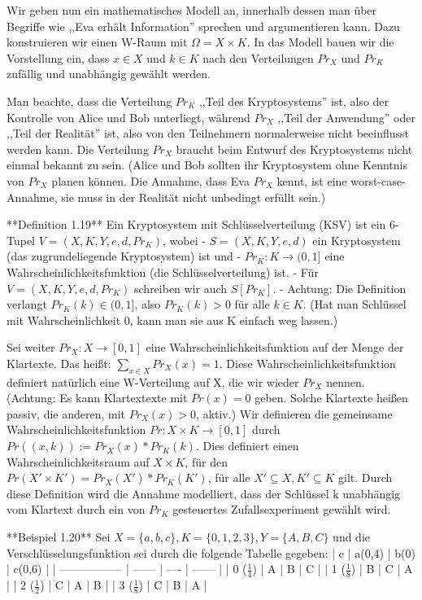 \documentclass[a4paper]{article}
\begin{document}
\begin{multicols}{3}
    Wir geben nun ein mathematisches Modell an, innerhalb dessen man über Begriffe wie ,,Eva erhält Information'' sprechen und argumentieren kann. Dazu konstruieren wir einen W-Raum mit $\Omega=X\times K$. In das Modell bauen wir die Vorstellung ein, dass $x\in X$ und $k\in K$ nach den Verteilungen $Pr_X$ und $Pr_K$ zufällig und unabhängig gewählt werden.

    Man beachte, dass die Verteilung $Pr_K$ ,,Teil des Kryptosystems'' ist, also der Kontrolle von Alice und Bob unterliegt, während $Pr_X$ ,,Teil der Anwendung'' oder ,,Teil der Realität'' ist, also von den Teilnehmern normalerweise nicht beeinflusst werden kann. Die Verteilung $Pr_X$ braucht beim Entwurf des Kryptosystems nicht einmal bekannt zu sein. (Alice und Bob sollten ihr Kryptosystem ohne Kenntnis von $Pr_X$ planen können. Die Annahme, dass Eva $Pr_X$ kennt, ist eine worst-case-Annahme, sie muss in der Realität nicht unbedingt erfüllt sein.)

    **Definition 1.19** Ein Kryptosystem mit Schlüsselverteilung (KSV) ist ein 6-Tupel $V=(X,K,Y,e,d,Pr_K)$, wobei
    - $S=(X,K,Y,e,d)$ ein Kryptosystem (das zugrundeliegende Kryptosystem) ist und
    - $Pr_K:K\rightarrow (0,1]$ eine Wahrscheinlichkeitsfunktion (die Schlüsselverteilung) ist.
    - Für $V=(X,K,Y,e,d,Pr_K)$ schreiben wir auch $S[Pr_K]$.
    - Achtung: Die Definition verlangt $Pr_K(k)\in (0,1]$, also $Pr_K(k)> 0$ für alle $k\in K$. (Hat man Schlüssel mit Wahrscheinlichkeit 0, kann man sie aus K einfach weg lassen.)

    Sei weiter $Pr_X:X\rightarrow [0,1]$ eine Wahrscheinlichkeitsfunktion auf der Menge der Klartexte. Das heißt: $\sum_{x\in X}Pr_X(x)=1$. Diese Wahrscheinlichkeitsfunktion definiert natürlich eine W-Verteilung auf X, die wir wieder $Pr_X$ nennen. (Achtung: Es kann Klartextexte mit $Pr(x)=0$ geben. Solche Klartexte heißen passiv, die anderen, mit $Pr_X(x)>0$, aktiv.) Wir definieren die gemeinsame Wahrscheinlichkeitsfunktion $Pr:X\times K\rightarrow [0,1]$ durch $Pr((x,k)):=Pr_X(x)*Pr_K(k)$.
    Dies definiert einen Wahrscheinlichkeitsraum auf $X\times K$, für den $Pr(X'\times K')=Pr_X(X')*Pr_K(K')$, für alle $X'\subseteq X,K'\subseteq K$ gilt. Durch diese Definition wird die Annahme modelliert, dass der Schlüssel k unabhängig vom Klartext durch ein von $Pr_K$ gesteuertes Zufallsexperiment gewählt wird.

    **Beispiel 1.20** Sei $X=\{a,b,c\},K=\{0,1,2,3\},Y=\{A,B,C\}$ und die Verschlüsselungsfunktion sei durch die folgende Tabelle gegeben:
    | e                 | a(0,4) | b(0) | c(0,6) |
    | ----------------- | ------ | ---- | ------ |
    | 0 ($\frac{1}{4}$) | A      | B    | C      |
    | 1 ($\frac{1}{8}$) | B      | C    | A      |
    | 2 ($\frac{1}{2}$) | C      | A    | B      |
    | 3 ($\frac{1}{8}$) | C      | B    | A      |


\end{multicols}
\end{document}
